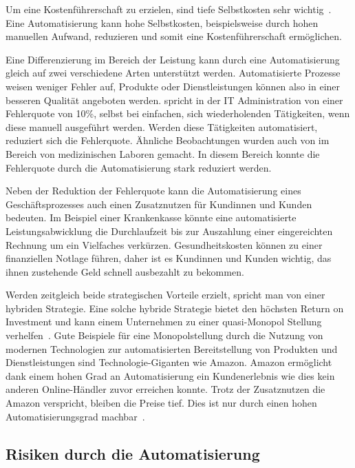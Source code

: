 Um eine Kostenführerschaft zu erzielen, sind tiefe Selbstkosten sehr wichtig~\autocite{Capaul2010}. Eine Automatisierung kann hohe Selbstkosten, beispielsweise durch hohen manuellen Aufwand, reduzieren und somit eine Kostenführerschaft ermöglichen.

Eine Differenzierung im Bereich der Leistung kann durch eine Automatisierung gleich auf zwei verschiedene Arten unterstützt werden. Automatisierte Prozesse weisen weniger Fehler auf, Produkte oder Dienstleistungen können also in einer besseren Qualität angeboten werden. \textcite{Kregassner2012} spricht in der IT Administration von einer Fehlerquote von 10\%, selbst bei einfachen, sich wiederholenden Tätigkeiten, wenn diese manuell ausgeführt werden. Werden diese Tätigkeiten automatisiert, reduziert sich die Fehlerquote. Ähnliche Beobachtungen wurden auch von \textcite{Uettwiller-Geiger2005} im Bereich von medizinischen Laboren gemacht. In diesem Bereich konnte die Fehlerquote durch die Automatisierung stark reduziert werden. 

Neben der Reduktion der Fehlerquote kann die Automatisierung eines Geschäftsprozesses auch einen Zusatznutzen für Kundinnen und Kunden bedeuten. Im Beispiel einer Krankenkasse könnte eine automatisierte Leistungsabwicklung die Durchlaufzeit bis zur Auszahlung einer eingereichten Rechnung um ein Vielfaches verkürzen. Gesundheitskosten können zu einer finanziellen Notlage führen, daher ist es Kundinnen und Kunden wichtig, das ihnen zustehende Geld schnell ausbezahlt zu bekommen.

Werden zeitgleich beide strategischen Vorteile erzielt, spricht man von einer hybriden Strategie. Eine solche hybride Strategie bietet den höchsten Return on Investment und kann einem Unternehmen zu einer quasi-Monopol Stellung verhelfen~\autocite{Lombriser2010}. Gute Beispiele für eine Monopolstellung durch die Nutzung von modernen Technologien zur automatisierten Bereitstellung von Produkten und Dienstleistungen sind Technologie-Giganten wie Amazon. Amazon ermöglicht dank einem hohen Grad an Automatisierung ein Kundenerlebnis wie dies kein anderen Online-Händler zuvor erreichen konnte. Trotz der Zusatznutzen die Amazon verspricht, bleiben die Preise tief. Dies ist nur durch einen hohen Automatisierungsgrad machbar~\autocite{Kha2000}.

\subsection{Risiken durch die Automatisierung}

